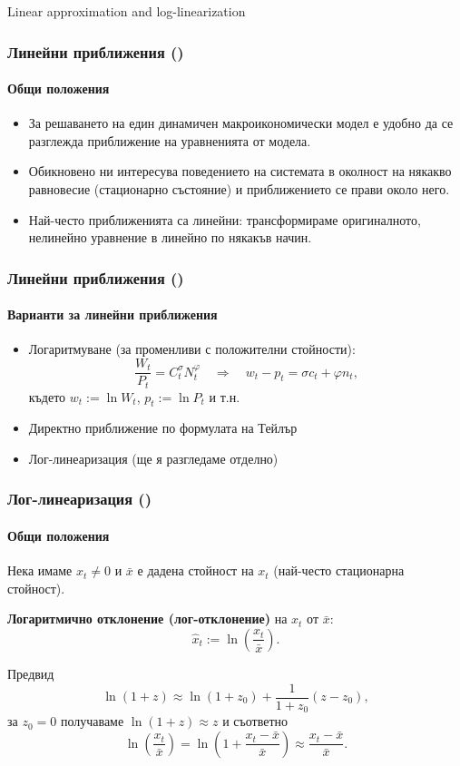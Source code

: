 \documentclass[10pt]{beamer}
\theoremstyle{definition}
\begin{document}
\begin{section}{Linear approximation and log-linearization}\label{sec:llin}

\begin{frame}\setcounter{slidenum}{1}
\frametitle{Линейни приближения ()}
\framesubtitle{Общи положения}
\begin{itemize}
\item За решаването на един динамичен макроикономически модел е удобно да се разглежда приближение на уравненията от модела.
\item Обикновено ни интересува поведението на системата в околност на някакво равновесие (стационарно състояние) и приближението се прави около него.
\item Най-често приближенията са линейни: трансформираме оригиналното, нелинейно уравнение в линейно по някакъв начин.
\end{itemize}
\end{frame}


\begin{frame}
\frametitle{Линейни приближения ()}
\framesubtitle{Варианти за линейни приближения}
\begin{itemize}
\item Логаритмуване (за променливи с положителни стойности):
\[ \frac{W_t}{P_t} = C_t^\sigma N_t^\varphi \quad\Longrightarrow\quad w_t - p_t = \sigma c_t + \varphi n_t, \] където $ w_t := \ln W_t $, $ p_t := \ln P_t $ и т.н. 
\item Директно приближение по формулата на Тейлър
\item Лог-линеаризация (ще я разгледаме отделно)
\end{itemize}
\end{frame}




\setcounter{slidenum}{1}\begin{frame} \frametitle{Лог-линеаризация
()}\framesubtitle{Общи положения}
Нека имаме $x_t \neq 0$ и $\bar{x}$ е дадена стойност на $x_t$ (най-често стационарна стойност).

\textbf{Логаритмично отклонение (лог-отклонение)} на $x_t$ от $\bar{x}$: $$\hat{x}_t := \ln \left(\frac{x_t}{\bar{x}}\right).$$

Предвид $$\ln (1+z)\approx \ln (1+z_0)+ \frac{1}{1+z_0}(z-z_0),$$ за $z_0=0$ получаваме $\ln (1+z) \approx z$ и съответно $$\ln \left(\frac{x_t}{\bar{x}}\right) = \ln \left(1+\frac{x_t-\bar{x}}{\bar{x}}\right)\approx \frac{x_t-\bar{x}}{\bar{x}}. $$
\end{frame}


\end{section}
\end{document}
